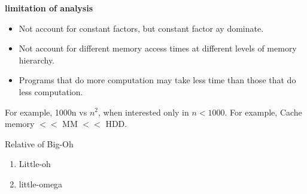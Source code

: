 \begin{section}
\textbf{limitation of analysis}
\begin{itemize}
    \item Not account for constant factors, but constant factor ay dominate.
    \item Not account for different memory access times at different levels of memory hierarchy.
    \item Programs that do more computation may take less time than those that do less computation.
\end{itemize}

For example, 1000n vs $n^2$, when interested only in $n < 1000$.
For example, Cache memory $<<$ MM $<<$ HDD.

\begin{subsection}
    {Relative of Big-Oh}
\end{subsection}
\begin{enumerate}
    \item Little-oh
    \item little-omega
\end{enumerate}

\bigskip
\end{section}